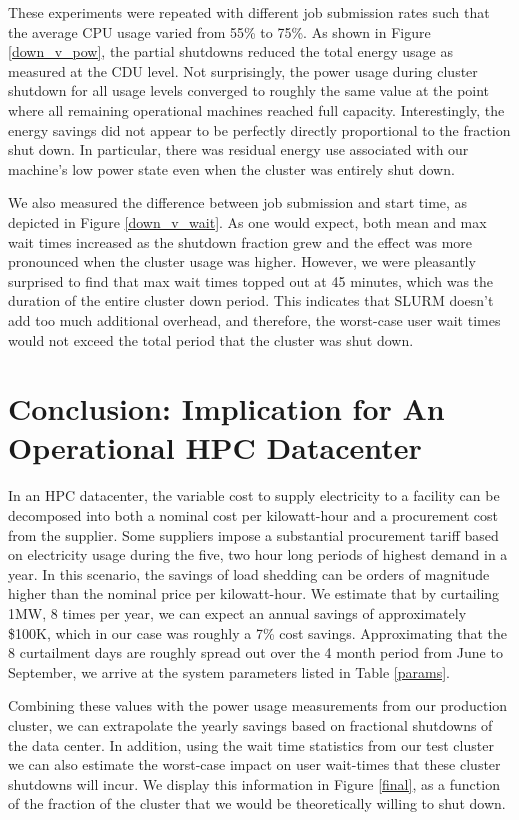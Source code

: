 These experiments were repeated with different job submission rates such that the average CPU usage varied from 55\% to 75\%.  As shown in Figure \ref{down_v_pow}, the partial shutdowns reduced the total energy usage as measured at the CDU level.  Not surprisingly, the power usage during cluster shutdown for all usage levels converged to roughly the same value at the point where all remaining operational machines reached full capacity. Interestingly, the energy savings did not appear to be perfectly directly proportional to the fraction shut down.  In particular, there was residual energy use associated with our machine's low power state even when the cluster was entirely shut down.   

We also measured the difference between job submission and start time, as depicted in Figure \ref{down_v_wait}.  As one would expect, both mean and max wait times increased as the shutdown fraction grew and the effect was more pronounced when the cluster usage was higher.  However, we were pleasantly surprised to find that max wait times topped out at 45 minutes, which was the duration of the entire cluster down period.  This indicates that SLURM doesn't add too much additional overhead, and therefore, the worst-case user wait times would not exceed the total period that the cluster was shut down.

\section{Conclusion: Implication for An Operational HPC Datacenter}


In an HPC datacenter, the variable cost to supply electricity to a facility can be decomposed into both a nominal cost per kilowatt-hour and a procurement cost from the supplier.  Some suppliers impose a substantial procurement tariff based on electricity usage during the five, two hour long periods of highest demand in a year.  In this scenario, the savings of load shedding can be orders of magnitude higher than the nominal price per kilowatt-hour.  We estimate that by curtailing 1MW, 8 times per year, we can expect an annual savings of approximately \$100K, which in our case was roughly a 7\% cost savings.  Approximating that the 8 curtailment days are roughly spread out over the 4 month period from June to September, we arrive at the system parameters listed in Table \ref{params}.



Combining these values with the power usage measurements from our production cluster, we can extrapolate the yearly savings based on fractional shutdowns of the data center.  In addition, using the wait time statistics from our test cluster we can also estimate the worst-case impact on user wait-times that these cluster shutdowns will incur.  We display this information in Figure \ref{final}, as a function of the fraction of the cluster that we would be theoretically willing to shut down.

